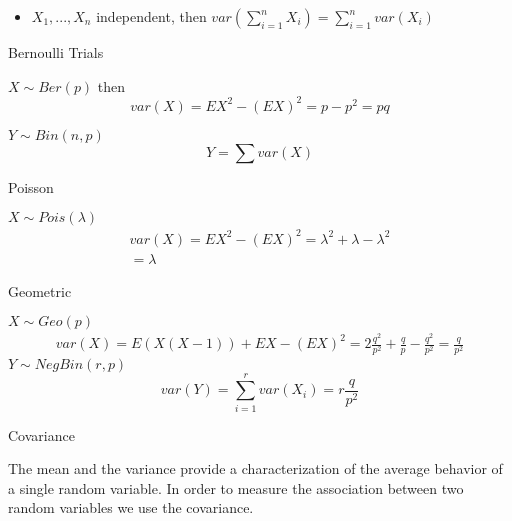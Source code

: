 \documentclass{report}
\begin{document}
\begin{description}
\begin{mdframed}
\begin{itemize}
                \item $X_1, ... ,X_n$ independent, then
                    $var(\sum_{i=1}^n X_i) = \sum_{i=1}^n var(X_i)$
            \end{itemize}
        \end{mdframed}
    \item {\large Bernoulli Trials} 
        \begin{mdframed}
            $X \sim Ber(p)$ then
             \begin{displaymath}
                var(X) = EX^2 - (EX)^2 = p - p^2 = pq
            \end{displaymath}
            
            $Y \sim Bin(n, p)$
            \begin{displaymath}
                Y = \sum var(X) 
            \end{displaymath}
            
        \end{mdframed}
    \item {\large Poisson}  
        \begin{mdframed}
            $X \sim Pois(\lambda)$
             \begin{gather}
                var(X) = EX^2 - (EX)^2 = \lambda^2 + \lambda - \lambda^2\\ 
                = \lambda
            \end{gather}
        \end{mdframed}
    \item {\large Geometric} 
        \begin{mdframed}
            $X \sim Geo(p)$
             \begin{gather}
               var(X) = E(X(X-1)) + EX - (EX)^2 
               = 2 \frac{q^2}{p^2} + \frac{q}{p} - \frac{q^2}{p^2}
               = \frac{q}{p^2}
            \end{gather}
            $Y \sim NegBin(r, p)$
             \begin{displaymath}
                var(Y) = \sum_{i=1}^r var(X_i) = r \frac{q}{p^2}
            \end{displaymath}
            
        \end{mdframed}
        \pagebreak
    \item {\large Covariance} 
        \begin{mdframed}
            The mean and the variance provide a characterization
            of the average behavior of a single random variable. In
            order to measure the association between two random
            variables we use the covariance.
            

\end{mdframed}
\end{description}
\end{document}
